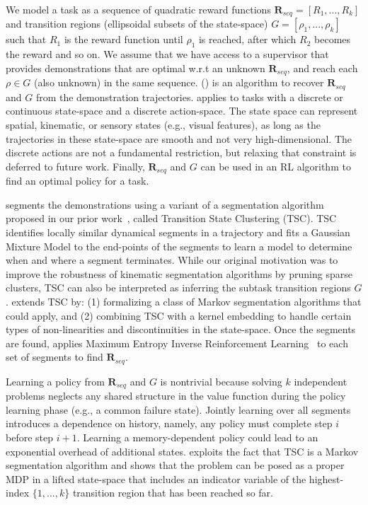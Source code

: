 We model a task as a sequence of quadratic reward functions $\mathbf{R}_{seq}=[R_1,...,R_k]$ and transition regions (ellipsoidal subsets of the state-space) $G = [\rho_1, ...,\rho_k]$ such that $R_1$ is the reward function until $\rho_1$ is reached, after which $R_2$ becomes the reward and so on.
We assume that we have access to a supervisor that provides demonstrations that are optimal w.r.t an unknown $\mathbf{R}_{seq}$, and reach each $\rho \in G$ (also unknown) in the same sequence. 
\hirlfull (\hirl) is an algorithm to recover $\mathbf{R}_{seq}$ and $G$ from the demonstration trajectories.
\hirl applies to tasks with a discrete or continuous state-space and a discrete action-space.
The state space can represent spatial, kinematic, or sensory states (e.g., visual features), as long as the trajectories in these state-space are smooth and not very high-dimensional.
The discrete actions are not a fundamental restriction, but relaxing that constraint is deferred to future work.
Finally, $\mathbf{R}_{seq}$ and $G$ can be used in an RL algorithm to find an optimal policy for a task.

\hirl segments the demonstrations using a variant of a segmentation algorithm proposed in our prior work~\cite{krishnan2015tsc,murali2016}, called Transition State Clustering (TSC).
TSC identifies locally similar dynamical segments in a trajectory and fits a Gaussian Mixture Model to the end-points of the segments to learn a model to determine when and where a segment terminates.
While our original motivation was to improve the robustness of kinematic segmentation algorithms by pruning sparse clusters, TSC can also be interpreted as inferring the subtask transition regions $G$.
\hirl extends TSC by: (1) formalizing a class of Markov segmentation algorithms that could apply, and (2) combining TSC with a kernel embedding to handle certain types of non-linearities and discontinuities in the state-space.
Once the segments are found, \hirl applies Maximum Entropy Inverse Reinforcement Learning~\cite{DBLP:conf/aaai/ZiebartMBD08} to each set of segments to find $\mathbf{R}_{seq}$.

Learning a policy from $\mathbf{R}_{seq}$ and $G$ is nontrivial because solving $k$ independent problems neglects any shared structure in the value function during the policy learning phase (e.g., a common failure state).
Jointly learning over all segments introduces a dependence on history, namely, any policy must complete step $i$ before step $i+1$.
Learning a memory-dependent policy could lead to an exponential overhead of additional states. 
\hirl exploits the fact that TSC is a Markov segmentation algorithm and shows that the problem can be posed as a proper MDP in a lifted state-space that includes an indicator variable of the highest-index $\{1,...,k\}$ transition region that has been reached so far.

